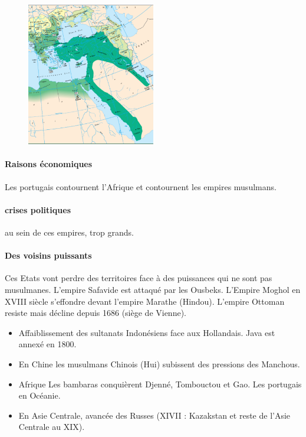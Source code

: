 \begin{figure}[h!]
    \centering
 \includegraphics[width=0.5\textwidth]{CourantsIslamContemporain/ImagesCourantsIslamContemporain/declinEmpireOttoman.png}
\end{figure}
 
 \paragraph{Raisons économiques} Les portugais contournent l'Afrique et contournent les empires musulmans.  
 \paragraph{crises politiques} au sein de ces empires, trop grands. 
 \paragraph{Des voisins puissants} Ces Etats vont perdre des territoires face à des puissances qui ne sont pas musulmanes. L'empire Safavide est attaqué par les Ousbeks. L'Empire Moghol en XVIII siècle s'effondre devant l'empire Marathe (Hindou). L'empire Ottoman resiste mais décline depuis 1686 (siège de Vienne). 
 \begin{itemize}
     \item  {Affaiblissement des sultanats Indonésiens} face aux Hollandais. Java est annexé en 1800. 
  \item {En Chine} les musulmans Chinois (Hui) subissent des pressions des Manchous.
   \item  {Afrique} Les bambaras conquièrent Djenné, Tombouctou et Gao. Les portugais en Océanie. 
  \item {En Asie Centrale}, avancée des Russes (XIVII : Kazakstan et reste de l'Asie Centrale au XIX).
 \end{itemize}

